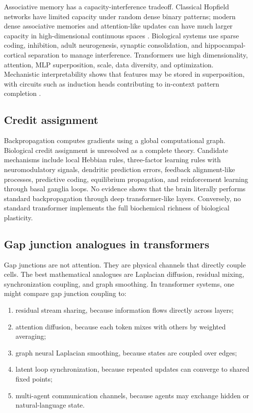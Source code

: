 \documentclass[11pt]{article}
\newcommand{\1}{\mathbf{1}}
\begin{document}
Associative memory has a capacity-interference tradeoff. Classical Hopfield networks have limited capacity under random dense binary patterns; modern dense associative memories and attention-like updates can have much larger capacity in high-dimensional continuous spaces \cite{Hopfield1982,KrotovHopfield2016,Ramsauer2021}. Biological systems use sparse coding, inhibition, adult neurogenesis, synaptic consolidation, and hippocampal-cortical separation to manage interference. Transformers use high dimensionality, attention, MLP superposition, scale, data diversity, and optimization. Mechanistic interpretability shows that features may be stored in superposition, with circuits such as induction heads contributing to in-context pattern completion \cite{Elhage2021,Olsson2022,Crosbie2025}.

\subsection{Credit assignment}

Backpropagation computes gradients using a global computational graph. Biological credit assignment is unresolved as a complete theory. Candidate mechanisms include local Hebbian rules, three-factor learning rules with neuromodulatory signals, dendritic prediction errors, feedback alignment-like processes, predictive coding, equilibrium propagation, and reinforcement learning through basal ganglia loops. No evidence shows that the brain literally performs standard backpropagation through deep transformer-like layers. Conversely, no standard transformer implements the full biochemical richness of biological plasticity.

\subsection{Gap junction analogues in transformers}

Gap junctions are not attention. They are physical channels that directly couple cells. The best mathematical analogues are Laplacian diffusion, residual mixing, synchronization coupling, and graph smoothing. In transformer systems, one might compare gap junction coupling to:

\begin{enumerate}
\item residual stream sharing, because information flows directly across layers;
\item attention diffusion, because each token mixes with others by weighted averaging;
\item graph neural Laplacian smoothing, because states are coupled over edges;
\item latent loop synchronization, because repeated updates can converge to shared fixed points;
\item multi-agent communication channels, because agents may exchange hidden or natural-language state.
\end{enumerate}
\end{document}
